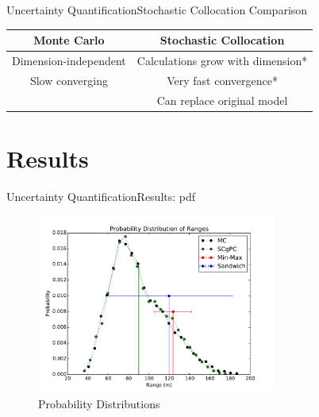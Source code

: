 \documentclass{beamer}
\begin{document}
\begin{frame}{Uncertainty Quantification}{Stochastic Collocation}\vspace{-20pt}
Comparison
\begin{table}
\centering
\begin{tabular}{c|c}\small
Monte Carlo & Stochastic Collocation \\\hline
Dimension-independent & Calculations grow with dimension* \\
Slow converging & Very fast convergence* \\
 & Can replace original model
\end{tabular}
\end{table}
\end{frame}

\section{Results}
\begin{frame}{Uncertainty Quantification}{Results: pdf}
  \begin{figure}[h!]
    \centering
      \includegraphics[width=0.7\textwidth]{../graphics/projectlePDF}
      \caption{Probability Distributions}
  \end{figure}
\end{frame}
\end{document}
